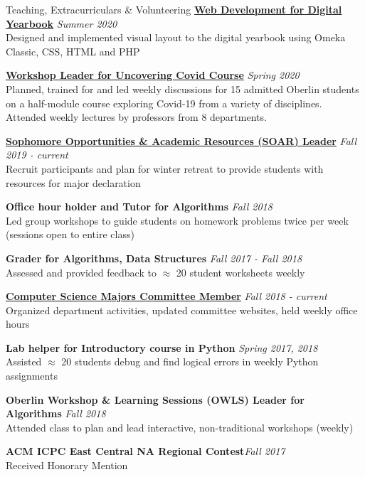 \documentclass{resume}
\begin{document}
\begin{rSection}{Teaching, Extracurriculars \& Volunteering}
{\bf \href{https://www.oc2020.oberlincollegelibrary.org/}{Web Development for Digital Yearbook}} \hfill{\em Summer 2020} \\
Designed and implemented visual layout to the digital yearbook using Omeka Classic, CSS, HTML and PHP

{\bf \href{https://www.oberlin.edu/admissions-and-aid/for-accepted-students/virtual-visits/covid-19-course}{Workshop Leader for Uncovering Covid Course}} \hfill{\em Spring 2020} \\
Planned, trained for and led weekly discussions for 15 admitted Oberlin students on a half-module course exploring Covid-19 from a variety of disciplines. Attended weekly lectures by professors from 8 departments.

{\bf \href{https://www.oberlin.edu/career/set/soar/soar-leaders}{Sophomore Opportunities \& Academic Resources (SOAR) Leader}} \hfill{\em Fall 2019 - current} \\
Recruit participants and plan for winter retreat to provide students with resources for major declaration

{\bf Office hour holder and Tutor for Algorithms} \hfill {\em Fall 2018} \\
{ Led group workshops to guide students on homework problems twice per week (sessions open to entire class)} 

{\bf Grader for Algorithms, Data Structures} \hfill {\em Fall 2017 - Fall 2018} \\
{ Assessed and provided feedback to  $\approx$ 20 student worksheets weekly} 

\href{http://www.cs.oberlin.edu/~csmc/officers.php}{\textbf{Computer Science Majors Committee Member}} \hfill {\em Fall 2018 - current} \\
{ Organized department activities, updated committee websites, held weekly office hours} 

{\bf Lab helper for Introductory course in Python} \hfill {\em Spring 2017, 2018} \\
{ Assisted $\approx$ 20 students debug and find logical errors in weekly Python assignments}

{\bf Oberlin Workshop \& Learning Sessions (OWLS) Leader for Algorithms} \hfill {\em Fall 2018} \\
{ Attended class to plan and lead interactive, non-traditional workshops (weekly)} 

{\bf ACM ICPC East Central NA Regional Contest}\hfill{\em Fall 2017} \\
{Received Honorary Mention} 


\end{rSection}
\end{document}
